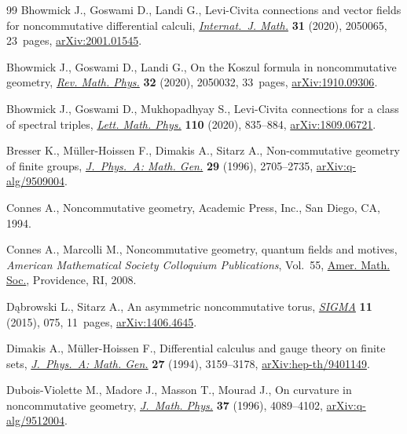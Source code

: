 \documentclass[10pt,a4paper]{amsart}
\numberwithin{equation}{section}
\begin{document}
\begin{thebibliography}{99}
Bhowmick J., Goswami D., Landi G., Levi-{C}ivita connections and vector fields
 for noncommutative differential calculi, \href{https://doi.org/10.1142/S0129167X20500652}{\textit{Internat.~J. Math.}}
 \textbf{31} (2020), 2050065, 23~pages, \href{https://arxiv.org/abs/2001.01545}{arXiv:2001.01545}.

Bhowmick J., Goswami D., Landi G., On the {K}oszul formula in noncommutative
 geometry, \href{https://doi.org/10.1142/S0129055X20500324}{\textit{Rev. Math. Phys.}} \textbf{32} (2020), 2050032, 33~pages,
 \href{https://arxiv.org/abs/1910.09306}{arXiv:1910.09306}.

Bhowmick J., Goswami D., Mukhopadhyay S., Levi-{C}ivita connections for a class
 of spectral triples, \href{https://doi.org/10.1007/s11005-019-01241-4}{\textit{Lett. Math. Phys.}} \textbf{110} (2020),
 835--884, \href{https://arxiv.org/abs/1809.06721}{arXiv:1809.06721}.

Bresser K., M\"uller-Hoissen F., Dimakis A., Sitarz A., Non-commutative
 geometry of finite groups, \href{https://doi.org/10.1088/0305-4470/29/11/010}{\textit{J.~Phys.~A: Math. Gen.}} \textbf{29}
 (1996), 2705--2735, \href{https://arxiv.org/abs/q-alg/9509004}{arXiv:q-alg/9509004}.

Connes A., Noncommutative geometry, Academic Press, Inc., San Diego, CA, 1994.

Connes A., Marcolli M., Noncommutative geometry, quantum fields and motives,
 \textit{American Mathematical Society Colloquium Publications}, Vol.~55,
 \href{https://doi.org/10.1090/coll/055}{Amer. Math. Soc.}, Providence, RI, 2008.

D\k{a}browski L., Sitarz A., An asymmetric noncommutative torus, \href{https://doi.org/10.3842/SIGMA.2015.075}{\textit{SIGMA}}
 \textbf{11} (2015), 075, 11~pages, \href{https://arxiv.org/abs/1406.4645}{arXiv:1406.4645}.

Dimakis A., M\"uller-Hoissen F., Differential calculus and gauge theory on
 finite sets, \href{https://doi.org/10.1088/0305-4470/27/9/028}{\textit{J.~Phys.~A: Math. Gen.}} \textbf{27} (1994), 3159--3178,
 \href{https://arxiv.org/abs/hep-th/9401149}{arXiv:hep-th/9401149}.

Dubois-Violette M., Madore J., Masson T., Mourad J., On curvature in
 noncommutative geometry, \href{https://doi.org/10.1063/1.531618}{\textit{J.~Math. Phys.}} \textbf{37} (1996),
 4089--4102, \href{https://arxiv.org/abs/q-alg/9512004}{arXiv:q-alg/9512004}.


\end{thebibliography}
\end{document}
